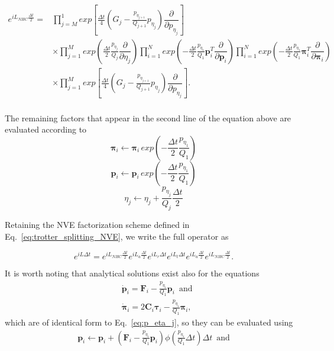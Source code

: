 \documentclass[aip,jcp,reprint,amsmath,amssymb]{revtex4-1}
\newcommand{\mt}[1]{\boldsymbol{\mathbf{#1}}}           %
\newcommand{\vt}[1]{\boldsymbol{\mathbf{#1}}}           %
\newcommand{\diff}[2]{\dfrac{\partial #1}{\partial #2}} %
\begin{document}
\begin{widetext}
\begin{equation}
\begin{split}
e^{iL_{NHC} \frac{\Delta t}{2}} =  &\prod_{j=M}^{1} exp\left[\frac{\Delta t}{4} \left( G_j - \frac{p_{\eta_{j+1}}}{Q_{j+1}} p_{\eta_j} \right) \diff{}{p_{\eta_j}}\right] \\
&  \times \prod_{j=1}^{M} exp\left(\frac{\Delta t}{2} \frac{p_{\eta_j}}{Q_j}\diff{}{\eta_j}\right)  \prod_{i=1}^{N} exp\left(-\frac{\Delta t}{2} \frac{p_{\eta_1}}{Q_1}\vt p_i^T \diff{}{\vt p_i}\right) \prod_{i=1}^{N} exp\left(-\frac{\Delta t}{2} \frac{p_{\eta_1}}{Q_1}\vt \pi_i^T \diff{}{\vt \pi_i}\right)  \\
& \times \prod_{j=1}^{M} exp\left[\frac{\Delta t}{4} \left( G_j - \frac{p_{\eta_{j+1}}}{Q_{j+1}} p_{\eta_j} \right) \diff{}{p_{\eta_j}}\right].\\
\end{split}
\end{equation}
\end{widetext}
The remaining factors that appear in the second line of the equation above are evaluated according to\cite{Martyna1996}
\begin{equation}
\vt \pi_i \leftarrow \vt \pi_i \, exp\left(-\frac{\Delta t}{2}\frac{p_{\eta_1}}{Q_1}\right)
\end{equation}
\begin{equation}
\vt p_i \leftarrow \vt p_i \, exp\left(-\frac{\Delta t}{2}\frac{p_{\eta_1}}{Q_1}\right)
\end{equation}
\begin{equation}
\eta_j  \leftarrow \eta_j + \frac{p_{\eta_j}}{ Q_j} \frac{\Delta t}{2} 
\end{equation}

Retaining the NVE factorization scheme defined in Eq.~\ref{eq:trotter_splitting_NVE}, we write the full operator as

\begin{equation}
\label{eq:trotter_splitting_NHC}
e^{i L \Delta t} =
e^{i L_{NHC} \frac{\Delta t}{2}} e^{i L_a \frac{\Delta t}{2}} e^{i L_r \Delta t} e^{i L_t \Delta t}  e^{i L_a \frac{\Delta t}{2}} e^{i L_{NHC} \frac{\Delta t}{2}}.
\end{equation}
 
It is worth noting that analytical solutions exist also for the equations
\begin{align*}
&\dot{\vt p}_i = {\vt F}_i - \frac{p_{\eta_1}}{Q_1} \vt p_i \, \text{ and} \\ 
&\dot{\vt \pi}_i = 2 \mt C_i \vt \tau_i - \frac{p_{\eta_1}}{Q_1} \vt \pi_i,
\end{align*}
which are of identical form to Eq.~\ref{eq:p_eta_j}, so they can be evaluated using
\begin{equation}
\label{eq:p}
\begin{split}
{\vt p}_i \leftarrow {\vt p}_i + \left({\vt F}_i - \frac{p_{\eta_1}}{Q_1} {\vt p}_i \right) \phi\left(\frac{p_{\eta_1}}{Q_1} \Delta t \right) \Delta t \, \text{ and}\\
\end{split}
\end{equation}
\end{document}
